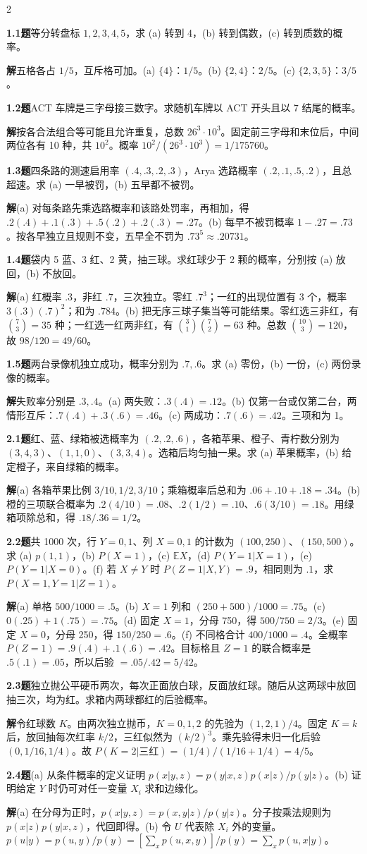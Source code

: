 \documentclass[a4paper]{article}
\newcommand{\cols}{2}
\newcommand{\cols}{4}
\newcommand{\topic}[1]{\par\addvspace{2.6pt}{\color{ink}\bfseries #1}\par\nobreak}
\newcommand{\problem}[2]{\par\addvspace{1.4pt}\textcolor{ink}{\textbf{#1}}\enspace\textbf{题}\enspace #2\par\nobreak}
\newcommand{\solve}{\noindent\textbf{解}\enspace}
\newcommand{\E}{\mathbb E}
\begin{document}
\begin{multicols}{\cols}
\topic{Tut 1 · 基础概率}
\problem{1.1}{等分转盘标 $1,2,3,4,5$，求 (a) 转到 4，(b) 转到偶数，(c) 转到质数的概率。}
\solve 五格各占 $1/5$，互斥格可加。(a) $\{4\}$：$1/5$。(b) $\{2,4\}$：$2/5$。(c) $\{2,3,5\}$：$3/5$。
\problem{1.2}{ACT 车牌是三字母接三数字。求随机车牌以 ACT 开头且以 7 结尾的概率。}
\solve 按各合法组合等可能且允许重复，总数 $26^3\cdot10^3$。固定前三字母和末位后，中间两位各有 10 种，共 $10^2$。概率 $10^2/(26^3\cdot10^3)=1/175760$。
\problem{1.3}{四条路的测速启用率 $(.4,.3,.2,.3)$，Arya 选路概率 $(.2,.1,.5,.2)$，且总超速。求 (a) 一早被罚，(b) 五早都不被罚。}
\solve (a) 对每条路先乘选路概率和该路处罚率，再相加，得 $.2(.4)+.1(.3)+.5(.2)+.2(.3)=.27$。(b) 每早不被罚概率 $1-.27=.73$。按各早独立且规则不变，五早全不罚为 $.73^5\approx.20731$。
\problem{1.4}{袋内 5 蓝、3 红、2 黄，抽三球。求红球少于 2 颗的概率，分别按 (a) 放回，(b) 不放回。}
\solve (a) 红概率 $.3$，非红 $.7$，三次独立。零红 $.7^3$；一红的出现位置有 3 个，概率 $3(.3)(.7)^2$；和为 $.784$。(b) 把无序三球子集当等可能结果。零红选三非红，有 $\binom73=35$ 种；一红选一红两非红，有 $\binom31\binom72=63$ 种。总数 $\binom{10}3=120$，故 $98/120=49/60$。
\problem{1.5}{两台录像机独立成功，概率分别为 $.7,.6$。求 (a) 零份，(b) 一份，(c) 两份录像的概率。}
\solve 失败率分别是 $.3,.4$。(a) 两失败：$.3(.4)=.12$。(b) 仅第一台或仅第二台，两情形互斥：$.7(.4)+.3(.6)=.46$。(c) 两成功：$.7(.6)=.42$。三项和为 1。

\topic{Tut 2 · 条件概率与 Bayes}
\problem{2.1}{红、蓝、绿箱被选概率为 $(.2,.2,.6)$，各箱苹果、橙子、青柠数分别为 $(3,4,3)$、$(1,1,0)$、$(3,3,4)$。选箱后均匀抽一果。求 (a) 苹果概率，(b) 给定橙子，来自绿箱的概率。}
\solve (a) 各箱苹果比例 $3/10,1/2,3/10$；乘箱概率后总和为 $.06+.10+.18=.34$。(b) 橙的三项联合概率为 $.2(4/10)=.08$、$.2(1/2)=.10$、$.6(3/10)=.18$。用绿箱项除总和，得 $.18/.36=1/2$。
\problem{2.2}{共 1000 次，行 $Y=0,1$、列 $X=0,1$ 的计数为 $(100,250)$、$(150,500)$。求 (a) $p(1,1)$，(b) $P(X=1)$，(c) $\E X$，(d) $P(Y=1|X=1)$，(e) $P(Y=1|X=0)$。(f) 若 $X\ne Y$ 时 $P(Z=1|X,Y)=.9$，相同则为 $.1$，求 $P(X=1,Y=1|Z=1)$。}
\solve (a) 单格 $500/1000=.5$。(b) $X=1$ 列和 $(250+500)/1000=.75$。(c) $0(.25)+1(.75)=.75$。(d) 固定 $X=1$，分母 750，得 $500/750=2/3$。(e) 固定 $X=0$，分母 250，得 $150/250=.6$。(f) 不同格合计 $400/1000=.4$。全概率 $P(Z=1)=.9(.4)+.1(.6)=.42$。目标格且 $Z=1$ 的联合概率是 $.5(.1)=.05$，所以后验 $=.05/.42=5/42$。
\problem{2.3}{独立抛公平硬币两次，每次正面放白球，反面放红球。随后从这两球中放回抽三次，均为红。求箱内两球都红的后验概率。}
\solve 令红球数 $K$。由两次独立抛币，$K=0,1,2$ 的先验为 $(1,2,1)/4$。固定 $K=k$ 后，放回抽每次红率 $k/2$，三红似然为 $(k/2)^3$。乘先验得未归一化后验 $(0,1/16,1/4)$。故 $P(K=2|\text{三红})=(1/4)/(1/16+1/4)=4/5$。
\problem{2.4}{(a) 从条件概率的定义证明 $p(x|y,z)=p(y|x,z)p(x|z)/p(y|z)$。(b) 证明给定 $Y$ 时仍可对任一变量 $X_i$ 求和边缘化。}
\solve (a) 在分母为正时，$p(x|y,z)=p(x,y|z)/p(y|z)$。分子按乘法规则为 $p(x|z)p(y|x,z)$，代回即得。(b) 令 $U$ 代表除 $X_i$ 外的变量。$p(u|y)=p(u,y)/p(y)=[\sum_x p(u,x,y)]/p(y)=\sum_x p(u,x|y)$。


\end{multicols}
\end{document}
